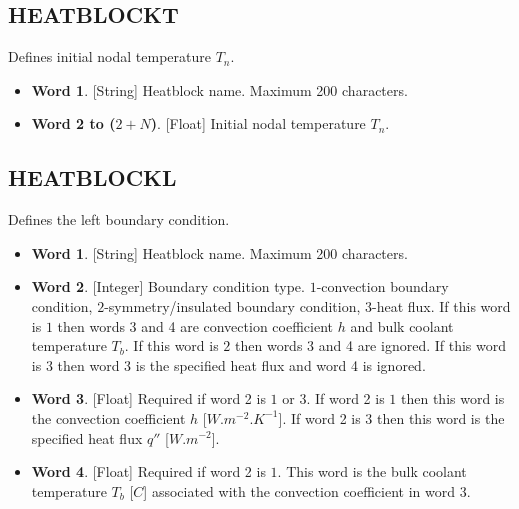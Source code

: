 \documentclass[11pt,letterpaper,titlepage]{article}
\begin{document}
\vspace{0.5cm}
\subsection{HEATBLOCKT}
Defines initial nodal temperature $T_n$.
\begin{itemize}
\item \textbf{Word 1}. [String] Heatblock name. Maximum 200 characters.
\item \textbf{Word 2 to ($2+N$)}. [Float] Initial nodal temperature $T_n$.
\end{itemize}

\vspace{0.5cm}
\subsection{HEATBLOCKL}
Defines the left boundary condition.
\begin{itemize}
\item \textbf{Word 1}. [String] Heatblock name. Maximum 200 characters.
\item \textbf{Word 2}. [Integer] Boundary condition type. $1$-convection boundary condition, $2$-symmetry/insulated boundary condition, $3$-heat flux. If this word is $1$ then words 3 and 4 are convection coefficient $h$ and bulk coolant temperature $T_b$. If this word is $2$ then words 3 and 4 are ignored. If this word is $3$ then word 3 is the specified heat flux and word 4 is ignored.
\item \textbf{Word 3}. [Float] Required if word 2 is $1$ or $3$. If word 2 is $1$ then this word is the convection coefficient $h$ [$W.m^{-2}.K^{-1}$]. If word 2 is $3$ then this word is the specified heat flux $q''$ [$W.m^{-2}$].
\item \textbf{Word 4}. [Float] Required if word 2 is $1$. This word is the bulk coolant temperature $T_b$ [$C$] associated with the convection coefficient in word 3.
\end{itemize}

\vspace{0.5cm}
\end{document}
